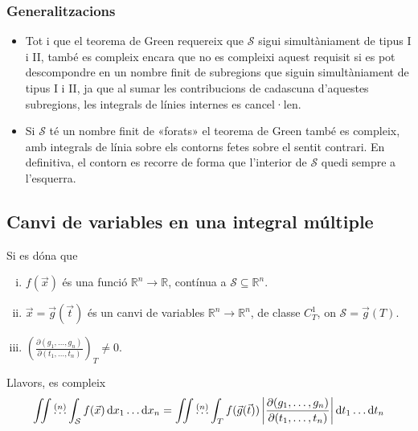 \subsubsection*{Generalitzacions}
\begin{itemize}
	\item Tot i que el teorema de Green requereix que $\mathcal{S}$ sigui simultàniament de tipus I i II, també es compleix encara que no es compleixi aquest requisit si es pot descompondre en un nombre finit de subregions que siguin simultàniament de tipus I i II, ja que al sumar les contribucions de cadascuna d'aquestes subregions, les integrals de línies internes es cancel·len.
	\item Si $\mathcal{S}$ té un nombre finit de «forats» el teorema de Green també es compleix, amb integrals de línia sobre els contorns fetes sobre el sentit contrari. En definitiva, el contorn es recorre de forma que l'interior de $\mathcal{S}$ quedi sempre a l'esquerra.
\end{itemize}

\subsection{Canvi de variables en una integral múltiple}
\begin{thm}
	Si es dóna que
	\begin{enumerate}[i)]
		\item $f(\vec{x})$ és una funció $\mathbb{R}^{n} \to \mathbb{R}$, contínua a $\mathcal{S} \subseteq \mathbb{R}^{n}$.
		\item $\vec{x} = \vec{g}(\vec{t})$ és un canvi de variables $\mathbb{R}^{n} \to \mathbb{R}^{n}$, de classe $C^{1}_{T}$, on $\mathcal{S} = \vec{g}(T)$.
		\item $\displaystyle \left(\frac{\partial (g_{1}, \dots, g_{n})}{\partial (t_{1}, \dots, t_{n})} \right)_{T} \neq 0$.
	\end{enumerate}
	Llavors, es compleix
	\begin{align}
	\iint \overset{(n)}{\dots} \int_{\mathcal{S}} f(\vec{x}) \mathop{}\!\mathrm{d} x_{1} \dots \mathrm{d} x_{n} = \iint \overset{(n)}{\dots} \int_{T} f(\vec{g}(\vec{t})) \left| \frac{\partial (g_{1}, \dots, g_{n})}{\partial (t_{1}, \dots, t_{n})} \right| \mathop{}\!\mathrm{d} t_{1} \dots \mathrm{d} t_{n}
	\end{align}
\end{thm}

